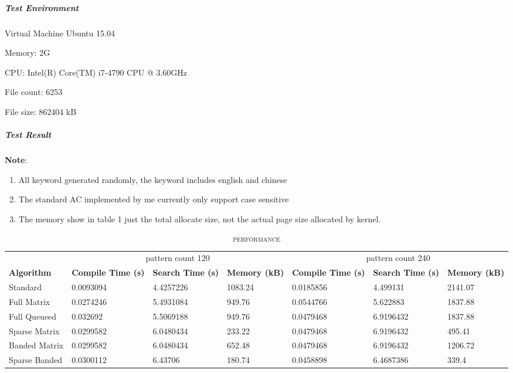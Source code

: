 \documentclass{article}
\begin{document}
\subparagraph{Test Environment}

 \begin{list}{}{}
 \item  Virtual Machine Ubuntu 15.04
 \item  Memory: 2G
 \item  CPU: Intel(R) Core(TM) i7-4790 CPU @ 3.60GHz
 \item  File count: 6253
 \item  File size: 862404 kB
 \end{list}

\subparagraph{Test Result}

\textbf{Note}:
\begin{enumerate}
  \item All keyword generated randomly, the keyword includes english and chinese
  \item The standard AC implemented by me currently only support case sensitive
  \item The memory show in table 1 just the total allocate size, not the actual page size allocated by kernel.
\end{enumerate}


\begin{table}[h]
\caption{\textsc{performance}}
\begin{tabular}{ |l|p{2cm}|p{2cm}|p{2cm}|p{2cm}|p{2cm}|p{2cm}| }
\hline\hline
& \multicolumn{3}{|c|}{pattern count 120}  &
  \multicolumn{3}{|c|}{pattern count 240} \\
\cline{2-7}
\textbf{Algorithm} & \textbf{Compile Time (s)}  & \textbf{Search Time (s)} & \textbf{Memory (kB)} & \textbf{Compile Time (s)} & \textbf{Search Time (s)} & \textbf{Memory (kB)} \\
\hline\hline
Standard      & 0.0093094 & 4.4257226 & 1083.24 & 0.0185856 & 4.499131 & 2141.07\\
Full Matrix   & 0.0274246 & 5.4931084 & 949.76 & 0.0544766 & 5.622883 & 1837.88\\
Full Queueed  & 0.032692  & 5.5069188 & 949.76 & 0.0479468 & 6.9196432 & 1837.88\\
Sparse Matrix & 0.0299582 & 6.0480434 & 233.22 & 0.0479468 & 6.9196432 & 495.41\\
Banded Matrix & 0.0299582 & 6.0480434 & 652.48 & 0.0479468 & 6.9196432 & 1206.72\\
Sparse Banded & 0.0300112 & 6.43706 & 180.74 & 0.0458898 & 6.4687386 & 339.4\\
\hline
\end{tabular}
\end{table}
\end{document}
